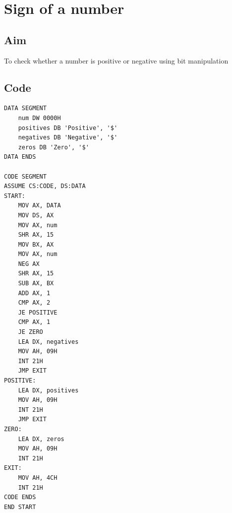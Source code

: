 \section{Sign of a number}
\subsection{Aim}
To check whether a number is positive or negative using bit manipulation

\subsection{Code}
\begin{lstlisting}
DATA SEGMENT
    num DW 0000H
    positives DB 'Positive', '$'
    negatives DB 'Negative', '$'
    zeros DB 'Zero', '$'   
DATA ENDS

CODE SEGMENT
ASSUME CS:CODE, DS:DATA  
START:
    MOV AX, DATA
    MOV DS, AX
    MOV AX, num
    SHR AX, 15 
    MOV BX, AX
    MOV AX, num
    NEG AX
    SHR AX, 15
    SUB AX, BX
    ADD AX, 1
    CMP AX, 2
    JE POSITIVE
    CMP AX, 1
    JE ZERO
    LEA DX, negatives
    MOV AH, 09H
    INT 21H
    JMP EXIT
POSITIVE:
    LEA DX, positives
    MOV AH, 09H
    INT 21H
    JMP EXIT
ZERO:
    LEA DX, zeros
    MOV AH, 09H
    INT 21H
EXIT:
    MOV AH, 4CH
    INT 21H
CODE ENDS
END START
\end{lstlisting}

